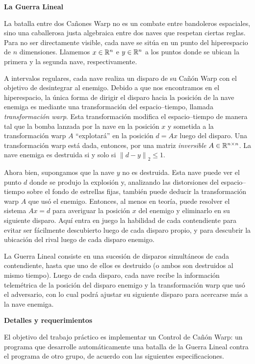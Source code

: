 {\bf La Guerra Lineal}

La batalla entre dos Ca\~nones Warp no es un combate entre bandoleros espaciales, sino una
caballerosa justa algebraica entre dos naves que respetan ciertas reglas. Para
no ser directamente visible, cada nave se sit\'ua en un punto del hiperespacio de $n$ dimensiones.
Llamemos $x \in \mathbb{R}^n$ e $y \in \mathbb{R}^n$ a los puntos donde se ubican la primera y la 
segunda nave, respectivamente.

A intervalos regulares, cada nave realiza un disparo de su Ca\~n\'on Warp con el objetivo de
desintegrar al enemigo. Debido a que nos encontramos en el hiperespacio, la \'unica forma de
dirigir el disparo hacia la posici\'on de la nave enemiga es mediante una transformaci\'on del
espacio--tiempo, llamada \emph{transformaci\'on warp}. Esta transformaci\'on modifica el espacio--tiempo 
de manera tal que la bomba lanzada por la nave en la posici\'on $x$ y sometida a la transformaci\'on warp $A$ ``explotar\'a'' en la posici\'on 
$d = A x$ luego del disparo. Una transformaci\'on warp est\'a dada, entonces, por una matriz \emph{inversible}
$A \in \mathbb{R}^{n \times n}$. La nave enemiga es destruida si y solo si 
$\left\| d - y \right\|_2  \leq 1$. 

Ahora bien, supongamos que la nave $y$ no es destruida. Esta nave puede ver el punto $d$ donde
se produjo la explosi\'on y, analizando las distorsiones del espacio--tiempo sobre el fondo de 
estrellas fijas, tambi\'en puede deducir la transformaci\'on warp $A$ que us\'o el enemigo. 
Entonces, al menos en teor\'ia, puede resolver el sistema $A x = d$ para averiguar la posici\'on 
$x$ del enemigo y eliminarlo en su siguiente disparo. Aqu\'i entra en juego la habilidad de cada 
contendiente para evitar ser f\'acilmente descubierto luego de cada disparo propio, y para descubrir 
la ubicaci\'on del rival luego de cada disparo enemigo.

La Guerra Lineal consiste en una sucesi\'on de disparos simult\'aneos de cada contendiente,
hasta que uno de ellos es destruido (o ambos son destruidos al mismo tiempo). Luego de cada
disparo, cada nave recibe la informaci\'on telem\'etrica de la posici\'on del disparo enemigo y la transformaci\'on
warp que us\'o el adversario, con lo cual podr\'a ajustar su siguiente disparo para acercarse m\'as
a la nave enemiga.

{\bf Detalles y requerimientos}

El objetivo del trabajo pr\'actico es implementar un Control de Ca\~n\'on Warp: un programa que desarrolle autom\'aticamente
una batalla de la Guerra Lineal contra el programa de otro grupo, de acuerdo con las siguientes
especificaciones. 

